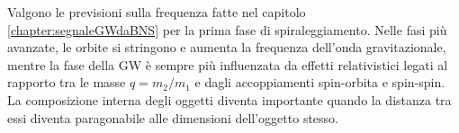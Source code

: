 Valgono le previsioni sulla frequenza fatte nel capitolo \ref{chapter:segnaleGWdaBNS} per la prima fase di spiraleggiamento. Nelle fasi più avanzate, le orbite si stringono e aumenta la frequenza dell'onda gravitazionale, mentre la fase della GW è sempre più influenzata da effetti relativistici legati al rapporto tra le masse $q = m_2/m_1$ e dagli accoppiamenti spin-orbita e spin-spin. La composizione interna degli oggetti diventa importante quando la distanza tra essi diventa paragonabile alle dimensioni dell'oggetto stesso. 

